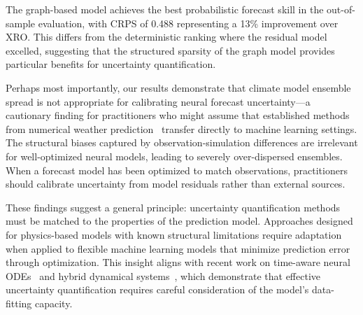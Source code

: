 The graph-based model achieves the best probabilistic forecast skill in the out-of-sample evaluation, with CRPS of 0.488 representing a 13\% improvement over XRO. This differs from the deterministic ranking where the residual model excelled, suggesting that the structured sparsity of the graph model provides particular benefits for uncertainty quantification.

Perhaps most importantly, our results demonstrate that climate model ensemble spread is not appropriate for calibrating neural forecast uncertainty---a cautionary finding for practitioners who might assume that established methods from numerical weather prediction~\cite{berner2017stochastic} transfer directly to machine learning settings. The structural biases captured by observation-simulation differences are irrelevant for well-optimized neural models, leading to severely over-dispersed ensembles. When a forecast model has been optimized to match observations, practitioners should calibrate uncertainty from model residuals rather than external sources.

These findings suggest a general principle: uncertainty quantification methods must be matched to the properties of the prediction model. Approaches designed for physics-based models with known structural limitations require adaptation when applied to flexible machine learning models that minimize prediction error through optimization. This insight aligns with recent work on time-aware neural ODEs~\cite{zhang2023timeaware} and hybrid dynamical systems~\cite{oh2024dualdynamics}, which demonstrate that effective uncertainty quantification requires careful consideration of the model's data-fitting capacity.
